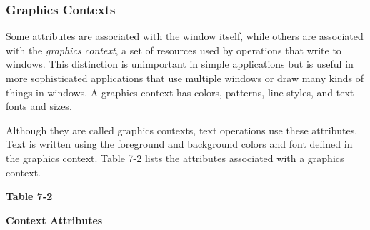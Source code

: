 \subsubsection{Graphics Contexts}

Some attributes are associated with the window itself, while others are
associated with the \textit{graphics context}, a set of resources
used by operations that write to windows. This distinction is unimportant
in simple applications but is useful in more sophisticated
applications that use multiple windows or draw many kinds of things in
windows. A graphics context has colors, patterns, line
styles, and text fonts and sizes.

Although they are called graphics contexts, text operations use these
attributes. Text is written using the foreground and background
colors and font defined in the graphics context. Table 7-2 lists
the attributes associated with a graphics context.

{\centering\sffamily\bfseries
Table 7-2
\par}

{\centering\sffamily\bfseries
Context Attributes
\par}

